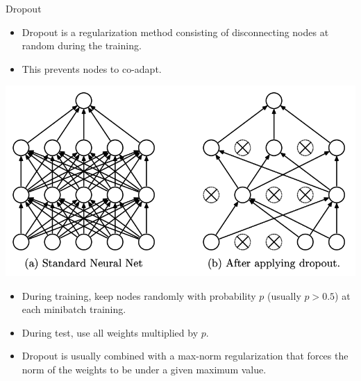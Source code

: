 \documentclass{beamer}
\begin{document}
\begin{frame}{Dropout}
\begin{itemize}
\item Dropout is a regularization method consisting of disconnecting nodes at random during the training. 
\item This prevents nodes to co-adapt.
\end{itemize} 
\begin{multicols}{2}

    \includegraphics[scale=0.4]{Module 4 (CNN)/pics/dropout.png}

\columnbreak
\begin{itemize}
    \item During training, keep nodes randomly with probability $p$ (usually $p > 0.5$) at each minibatch training. 
    \item During test, use all weights multiplied by $p$.
\end{itemize}
\end{multicols}
\begin{itemize}
    \item Dropout is usually combined with a max-norm regularization that forces the norm of the weights to be under a given maximum value.
\end{itemize}
\end{frame}
\end{document}
